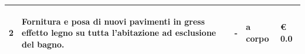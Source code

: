 \documentclass[a4paper]{article}
\begin{document}
\begin{tabular}{ | L{10mm} |  L{86mm} | L{12mm} | L{12mm} | L{16mm} | }
                                 
                                   \vspace{2.5mm}
                                   \begin{spacing}{0}
                                2
                                   \end{spacing} &
                                   \vspace{2.5mm}
                                   \begin{spacing}{0}
                                Fornitura e posa di nuovi pavimenti in gress effetto legno su tutta l'abitazione ad esclusione del bagno.
                                   \end{spacing} &
                                   \vspace{2.5mm}
                                   \begin{spacing}{0}
                                -
                                   \end{spacing} &
                                   \vspace{2.5mm}
                                   \begin{spacing}{0}
                                a corpo
                                   \end{spacing} &
                                   \vspace{2.5mm}
                                   \begin{spacing}{0}
                                     \euro\hfill 
                                 0.0
                                   \end{spacing} \\
                                   \hline


\end{tabular}
\end{document}
